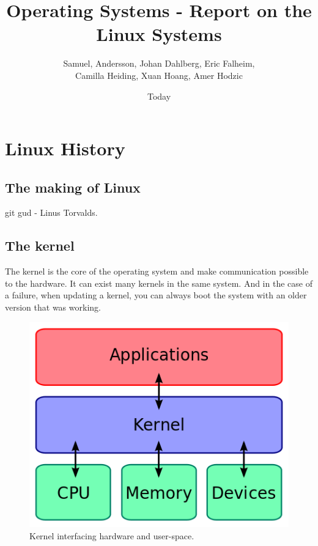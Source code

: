 \documentclass[12pt]{article}
\begin{document}
\title{Operating Systems - Report on the Linux Systems}
\author{Samuel, Andersson, Johan Dahlberg, Eric Falheim, \\Camilla Heiding, Xuan Hoang, Amer Hodzic}
\date{Today}
\maketitle

\newpage
\tableofcontents
\newpage

\section{Linux History} %
\subsection{The making of Linux}
git gud - Linus Torvalds.

\subsection{The kernel}
The kernel is the core of the operating system and make communication possible to the hardware.
It can exist many kernels in the same system. And in the case of a failure, when updating a kernel,
you can always boot the system with an older version that was working.

\begin{figure}[h]
  \begin{center}
    \includegraphics[scale=0.5]{imgs/structure}
    \caption{Kernel interfacing hardware and user-space.}
  \end{center}
\end{figure}
\end{document}

